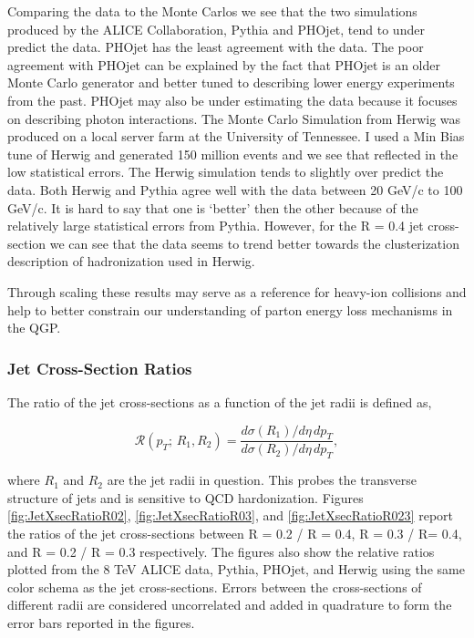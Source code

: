Comparing the data to the Monte Carlos we see that the two simulations produced by the ALICE Collaboration, Pythia and PHOjet, tend to under predict the data.  PHOjet has the least agreement with the data.  The poor agreement with PHOjet can be explained by the fact that PHOjet is an older Monte Carlo generator and better tuned to describing lower energy experiments from the past.  PHOjet may also be under estimating the data because it focuses on describing photon interactions.  The Monte Carlo Simulation from Herwig was produced on a local server farm at the University of Tennessee.  I used a Min Bias tune of Herwig and generated 150 million events and we see that reflected in the low statistical errors.  The Herwig simulation tends to slightly over predict the data.  Both Herwig and Pythia agree well with the data between 20 GeV/c to 100 GeV/c.  It is hard to say that one is `better' then the other because of the relatively large statistical errors from Pythia.  However, for the R = 0.4 jet cross-section we can see that the data seems to trend better towards the clusterization description of hadronization used in Herwig.

Through scaling these results may serve as a reference for heavy-ion collisions and help to better constrain our understanding of parton energy loss mechanisms in the QGP.  


\subsubsection{Jet Cross-Section Ratios}


\noindent
The ratio of the jet cross-sections as a function of the jet radii is defined as,

\begin{equation}
\mathscr{R} (p_{T}; \, R_{1},R_{2}) = \frac{d\sigma(R_{1}) /d\eta \, dp_{T} }{d\sigma (R_{2}) /d\eta \, dp_{T}},
\label{eq:jetxsecratio}
\end{equation}

\noindent
where $R_{1}$ and $R_{2}$ are the jet radii in question. This probes the transverse structure of jets and is sensitive to QCD hardonization\cite{SOYEZ201159}.  Figures \ref{fig:JetXsecRatioR02}, \ref{fig:JetXsecRatioR03}, and \ref{fig:JetXsecRatioR023} report the ratios of the jet cross-sections between R = 0.2 / R = 0.4, R = 0.3 / R= 0.4, and R = 0.2 / R = 0.3 respectively.  The figures also show the relative ratios plotted from the 8 TeV ALICE data, Pythia, PHOjet, and Herwig using the same color schema as the jet cross-sections.  Errors between the cross-sections of different radii are considered uncorrelated and added in quadrature to form the error bars reported in the figures.

